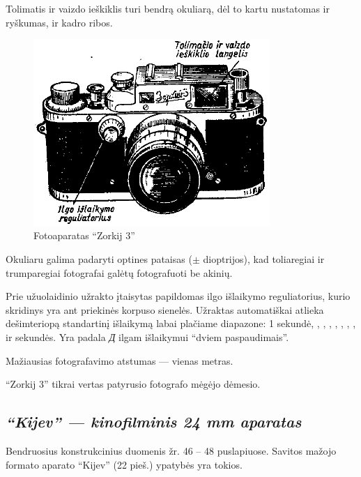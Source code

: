 \documentclass[12pt]{book}
\begin{document}
			Tolimatis ir vaizdo ieškiklis turi bendrą okuliarą, dėl to kartu nustatomas ir ryškumas, ir kadro ribos.
			\begin{figure}[h]
				\centering
				\includegraphics[width=0.8\textwidth]{21-pav}
				\caption{Fotoaparatas ``Zorkij 3''}
				\label{fig:21}
			\end{figure}
			Okuliaru galima padaryti optines pataisas ($\pm$ dioptrijos), kad toliaregiai ir trumparegiai fotografai galėtų fotografuoti be akinių.

			Prie užuolaidinio užrakto įtaisytas papildomas ilgo išlaikymo reguliatorius, kurio skridinys yra ant priekinės korpuso sienelės. Užraktas automatiškai atlieka dešimteriopą standartinį išlaikymą labai plačiame diapazone: 1 sekundė, , , , , , , ,  ir  sekundės. Yra padala \textit{\foreignlanguage{russian}{Д}} ilgam išlaikymui ``dviem paspaudimais''.

			Mažiausias fotografavimo atstumas --- vienas metras.

			``Zorkij 3'' tikrai vertas patyrusio fotografo mėgėjo dėmesio.
		\subsection*{\textit{``Kijev'' --- kinofilminis 24  mm aparatas}}
			Bendruosius konstrukcinius duomenis žr. 46 -- 48 puslapiuose. Savitos mažojo formato aparato ``Kijev'' (22 pieš.) ypatybės yra tokios.
\end{document}
